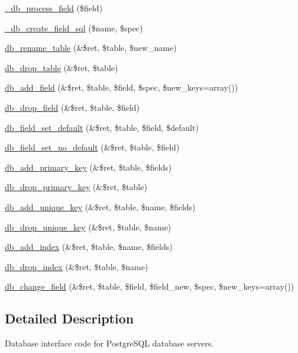 \begin{Indent}{\bf }
\begin{CompactItemize}
\item 
\hyperlink{group__schemaapi_g4c5486f85f0d1feeb4efba32f01926fb}{\_\-db\_\-process\_\-field} (\$field)
\item 
\hyperlink{group__schemaapi_ge5ec976573ad46239192dcd139d07f10}{\_\-db\_\-create\_\-field\_\-sql} (\$name, \$spec)
\item 
\hyperlink{group__schemaapi_gbb4d2d8b00f915ba7e8c0a9d985d597d}{db\_\-rename\_\-table} (\&\$ret, \$table, \$new\_\-name)
\item 
\hyperlink{group__schemaapi_g1da2016702d7da653316aa34fcd86bd9}{db\_\-drop\_\-table} (\&\$ret, \$table)
\item 
\hyperlink{group__schemaapi_gdffaa3314b3f50ffd6ba4da381ec78fb}{db\_\-add\_\-field} (\&\$ret, \$table, \$field, \$spec, \$new\_\-keys=array())
\item 
\hyperlink{group__schemaapi_ge2013b878edbcfe21ca123e73af4684a}{db\_\-drop\_\-field} (\&\$ret, \$table, \$field)
\item 
\hyperlink{group__schemaapi_gf5a1ae05cf11189bc6e0f6a8ed2b7701}{db\_\-field\_\-set\_\-default} (\&\$ret, \$table, \$field, \$default)
\item 
\hyperlink{group__schemaapi_ga01758e1338d2b1ce59da26c08c6448a}{db\_\-field\_\-set\_\-no\_\-default} (\&\$ret, \$table, \$field)
\item 
\hyperlink{group__schemaapi_g95e6db824dbcdd4f9f486e657137d482}{db\_\-add\_\-primary\_\-key} (\&\$ret, \$table, \$fields)
\item 
\hyperlink{group__schemaapi_gb8ee0e7e9ca04e60ec8b0464a247425d}{db\_\-drop\_\-primary\_\-key} (\&\$ret, \$table)
\item 
\hyperlink{group__schemaapi_g407af986b5e78e1ef11242d5be8adfc4}{db\_\-add\_\-unique\_\-key} (\&\$ret, \$table, \$name, \$fields)
\item 
\hyperlink{group__schemaapi_g727ffb0cbdb6bc2afd5803b09e296603}{db\_\-drop\_\-unique\_\-key} (\&\$ret, \$table, \$name)
\item 
\hyperlink{group__schemaapi_gaaa3b734b6b1acc09fb5e2ac8bd7d925}{db\_\-add\_\-index} (\&\$ret, \$table, \$name, \$fields)
\item 
\hyperlink{group__schemaapi_g3a9c0b20502c5afb8177be5753f8cdbb}{db\_\-drop\_\-index} (\&\$ret, \$table, \$name)
\item 
\hyperlink{group__schemaapi_g03f152245358d2db68d067aa8a1fceb4}{db\_\-change\_\-field} (\&\$ret, \$table, \$field, \$field\_\-new, \$spec, \$new\_\-keys=array())
\end{CompactItemize}
\end{Indent}


\subsection{Detailed Description}
Database interface code for PostgreSQL database servers. 